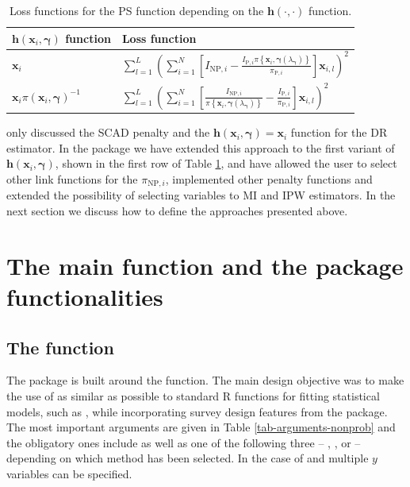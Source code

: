 \documentclass[
]{jss}
\begin{document}
\begin{table}[ht!]
\centering
\begin{tabular}{ll}
\hline
$\boldsymbol{h}(\boldsymbol{x}_i, \boldsymbol{\gamma})$ function &  Loss function\\
\hline
$\boldsymbol{x}_i$ & $\sum_{l=1}^L\left(\sum_{i=1}^N\left[I_{\text{NP},i} - \frac{I_{\text{P},i}\pi\left\{\boldsymbol{x}_i, \boldsymbol{\gamma}(\lambda_{\boldsymbol{\gamma}})\right\}}{\pi_{\text{P},i}}\right] \boldsymbol{x}_{i,l}\right)^2$\\
\hline
$\boldsymbol{x}_i \pi(\boldsymbol{x}_i, \boldsymbol{\gamma})^{-1}$ & $\sum_{l=1}^L\left(\sum_{i=1}^N\left[\frac{I_{\text{NP},i}}{\pi\left\{\boldsymbol{x}_i, \boldsymbol{\gamma}(\lambda_{\boldsymbol{\gamma}})\right\}}-\frac{I_{\text{P},i}}{\pi_{\text{P},i}}\right] \boldsymbol{x}_{i,l}\right)^2$ \\
\hline
\end{tabular}
\caption{Loss functions for the PS function depending on the $\boldsymbol{h}(\cdot,\cdot)$ function.}
\label{tab-varsel-loss-ipw}
\end{table}

\citet{yang_doubly_2020} only discussed the SCAD penalty and the
\(\boldsymbol{h}(\boldsymbol{x}_i, \boldsymbol{\gamma})=\boldsymbol{x}_i\)
function for the DR estimator. In the  package we have
extended this approach to the first variant of
\(\boldsymbol{h}(\boldsymbol{x}_i, \boldsymbol{\gamma})\), shown in the
first row of Table \ref{tab-varsel-loss-ipw}, and have allowed the user
to select other link functions for the \(\pi_{\text{NP},i}\),
implemented other penalty functions and extended the possibility of
selecting variables to MI and IPW estimators. In the next section we
discuss how to define the approaches presented above.

\section{The main function and the package
functionalities}\label{sec-package}

\subsection[The nonprob function]{The  function}

The  package is built around the 
function. The main design objective was to make the use of
 as similar as possible to standard R functions for
fitting statistical models, such as , while
incorporating survey design features from the  package. The
most important arguments are given in Table \ref{tab-arguments-nonprob}
and the obligatory ones include  as well as one of the
following three -- , , or  --
depending on which method has been selected. In the case of
 and  multiple \(y\) variables can be
specified.
\end{document}
